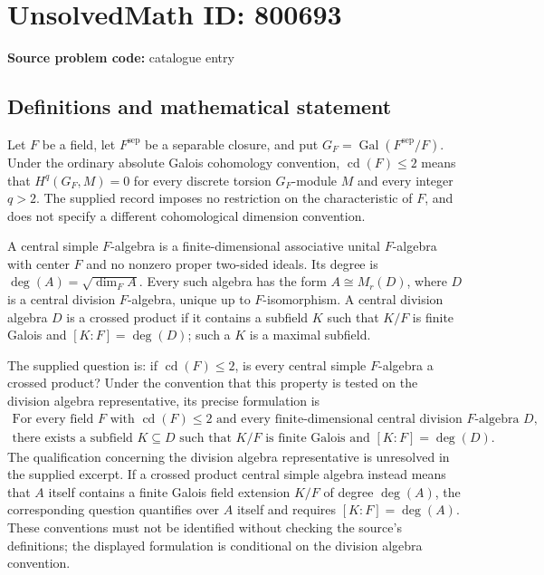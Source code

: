 \documentclass[11pt]{article}
\begin{document}
\section*{UnsolvedMath ID: 800693}
\textbf{Source problem code:} catalogue entry
\subsection{Definitions and mathematical statement}
Let \(F\) be a field, let \(F^{\mathrm{sep}}\) be a separable closure, and put \(G_F=\operatorname{Gal}(F^{\mathrm{sep}}/F)\). Under the ordinary absolute Galois cohomology convention, \(\operatorname{cd}(F)\leq 2\) means that \(H^q(G_F,M)=0\) for every discrete torsion \(G_F\)-module \(M\) and every integer \(q>2\). The supplied record imposes no restriction on the characteristic of \(F\), and does not specify a different cohomological dimension convention.

A central simple \(F\)-algebra is a finite-dimensional associative unital \(F\)-algebra with center \(F\) and no nonzero proper two-sided ideals. Its degree is \(\deg(A)=\sqrt{\dim_F A}\). Every such algebra has the form \(A\cong M_r(D)\), where \(D\) is a central division \(F\)-algebra, unique up to \(F\)-isomorphism. A central division algebra \(D\) is a crossed product if it contains a subfield \(K\) such that \(K/F\) is finite Galois and \([K:F]=\deg(D)\); such a \(K\) is a maximal subfield.

The supplied question is: if \(\operatorname{cd}(F)\leq 2\), is every central simple \(F\)-algebra a crossed product? Under the convention that this property is tested on the division algebra representative, its precise formulation is
\[
\begin{gathered}
\text{For every field }F\text{ with }\operatorname{cd}(F)\leq 2
\text{ and every finite-dimensional central division }F\text{-algebra }D,\\
\text{there exists a subfield }K\subseteq D\text{ such that }
K/F\text{ is finite Galois and }[K:F]=\deg(D).
\end{gathered}
\]
The qualification concerning the division algebra representative is unresolved in the supplied excerpt. If a crossed product central simple algebra instead means that \(A\) itself contains a finite Galois field extension \(K/F\) of degree \(\deg(A)\), the corresponding question quantifies over \(A\) itself and requires \([K:F]=\deg(A)\). These conventions must not be identified without checking the source's definitions; the displayed formulation is conditional on the division algebra convention.
\end{document}
